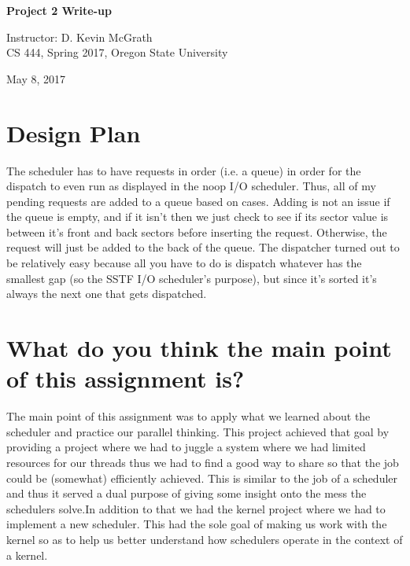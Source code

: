 \documentclass[letterpaper, 10pt,titlepage]{article}
\newcommand\tab[1][1cm]{\hspace*{#1}}
\begin{document}
\begin{titlepage}
\begin{center}
    \Huge
    \vspace{1.0cm}
    \textbf{Project 2 Write-up}\\
    \vspace{13.0 cm}

    \large
    Instructor: D. Kevin McGrath\\
    \large
    CS 444, Spring 2017, Oregon State University\\



    \vspace{3.2cm}

    \end{center}
    \vfill
\begin{center}    
    May 8, 2017

\end{center}
\end{titlepage}



\section{Design Plan}
\tab The scheduler has to have requests in order (i.e. a queue) in order for the dispatch to even run as displayed in the noop I/O scheduler. Thus, all of my pending requests are added to a queue based on cases. Adding is not an issue if the queue is empty, and if it isn't then we just check to see if its sector value is between it's front and back sectors before inserting the request. Otherwise, the request will just be added to the back of the queue. The dispatcher turned out to be relatively easy because all you have to do is dispatch whatever has the smallest gap (so the SSTF I/O scheduler's purpose), but since it's sorted it's always the next one that gets dispatched.

\section{What do you think the main point of this assignment is?}
\tab The main point of this assignment was to apply what we learned about the scheduler and practice our parallel thinking. This project achieved that goal by providing a project where we had to juggle a system where we had limited resources for our threads thus we had to find a good way to share so that the job could be (somewhat) efficiently achieved. This is similar to the job of a scheduler and thus it served a dual purpose of giving some insight onto the mess the schedulers solve.In addition to that we had the kernel project where we had to implement a new scheduler. This had the sole goal of making us work with the kernel so as to help us better understand how schedulers operate in the context of a kernel.
\end{document}
